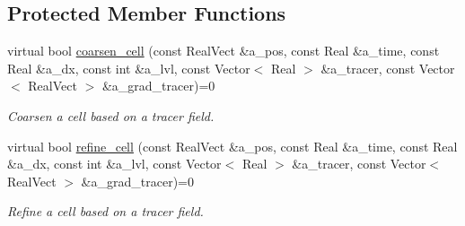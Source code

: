 \subsection*{Protected Member Functions}
\begin{DoxyCompactItemize}
\item 
virtual bool \hyperlink{classcell__tagger_ae4b0418cb42a96bcfbcdc2a02323880e}{coarsen\+\_\+cell} (const Real\+Vect \&a\+\_\+pos, const Real \&a\+\_\+time, const Real \&a\+\_\+dx, const int \&a\+\_\+lvl, const Vector$<$ Real $>$ \&a\+\_\+tracer, const Vector$<$ Real\+Vect $>$ \&a\+\_\+grad\+\_\+tracer)=0
\begin{DoxyCompactList}\small\item\em Coarsen a cell based on a tracer field. \end{DoxyCompactList}\item 
virtual bool \hyperlink{classcell__tagger_afb51f91684b877164e2616bf205453b4}{refine\+\_\+cell} (const Real\+Vect \&a\+\_\+pos, const Real \&a\+\_\+time, const Real \&a\+\_\+dx, const int \&a\+\_\+lvl, const Vector$<$ Real $>$ \&a\+\_\+tracer, const Vector$<$ Real\+Vect $>$ \&a\+\_\+grad\+\_\+tracer)=0
\begin{DoxyCompactList}\small\item\em Refine a cell based on a tracer field. \end{DoxyCompactList}\end{DoxyCompactItemize}
